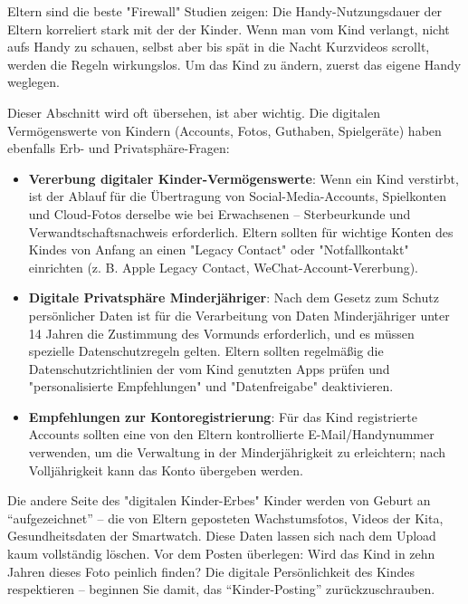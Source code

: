 \begin{tcbinfo}{Eltern sind die beste "Firewall"}
Studien zeigen: Die Handy-Nutzungsdauer der Eltern korreliert stark mit der der Kinder. Wenn man vom Kind verlangt, nicht aufs Handy zu schauen, selbst aber bis spät in die Nacht Kurzvideos scrollt, werden die Regeln wirkungslos. Um das Kind zu ändern, zuerst das eigene Handy weglegen.

\end{tcbinfo}


Dieser Abschnitt wird oft übersehen, ist aber wichtig. Die digitalen Vermögenswerte von Kindern (Accounts, Fotos, Guthaben, Spielgeräte) haben ebenfalls Erb- und Privatsphäre-Fragen:

\begin{itemize}
  \item \textbf{Vererbung digitaler Kinder-Vermögenswerte}: Wenn ein Kind verstirbt, ist der Ablauf für die Übertragung von Social-Media-Accounts, Spielkonten und Cloud-Fotos derselbe wie bei Erwachsenen – Sterbeurkunde und Verwandtschaftsnachweis erforderlich. Eltern sollten für wichtige Konten des Kindes von Anfang an einen "Legacy Contact" oder "Notfallkontakt" einrichten (z. B. Apple Legacy Contact, WeChat-Account-Vererbung).
  \item \textbf{Digitale Privatsphäre Minderjähriger}: Nach dem Gesetz zum Schutz persönlicher Daten ist für die Verarbeitung von Daten Minderjähriger unter 14 Jahren die Zustimmung des Vormunds erforderlich, und es müssen spezielle Datenschutzregeln gelten. Eltern sollten regelmäßig die Datenschutzrichtlinien der vom Kind genutzten Apps prüfen und "personalisierte Empfehlungen" und "Datenfreigabe" deaktivieren.
  \item \textbf{Empfehlungen zur Kontoregistrierung}: Für das Kind registrierte Accounts sollten eine von den Eltern kontrollierte E-Mail/Handynummer verwenden, um die Verwaltung in der Minderjährigkeit zu erleichtern; nach Volljährigkeit kann das Konto übergeben werden.
\end{itemize}

\begin{tcbwarn}{Die andere Seite des "digitalen Kinder-Erbes"}
Kinder werden von Geburt an “aufgezeichnet” – die von Eltern geposteten Wachstumsfotos, Videos der Kita, Gesundheitsdaten der Smartwatch. Diese Daten lassen sich nach dem Upload kaum vollständig löschen. Vor dem Posten überlegen: Wird das Kind in zehn Jahren dieses Foto peinlich finden? Die digitale Persönlichkeit des Kindes respektieren – beginnen Sie damit, das “Kinder-Posting” zurückzuschrauben.

\end{tcbwarn}

